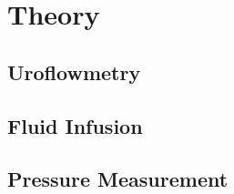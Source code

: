 \section{Theory}

\subsection{Uroflowmetry}

\subsection{Fluid Infusion}

\subsection{Pressure Measurement}

\clearpage